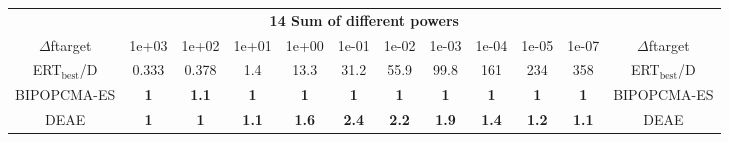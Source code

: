 \begin{tabular}{cccccccccccc}
 & \multicolumn{10}{c}{{\normalsize \textbf{14 Sum of different powers}}}\\
$\Delta$ftarget& 1e+03& 1e+02& 1e+01& 1e+00& 1e-01& 1e-02& 1e-03& 1e-04& 1e-05& 1e-07 & $\Delta$ftarget \\
ERT$_{\textrm{best}}$/D& 0.333& 0.378& 1.4& 13.3& 31.2& 55.9& 99.8& 161& 234& 358 & ERT$_{\textrm{best}}$/D \\
\hline
BIPOPCMA-ES & \textbf{1} & \textbf{1.1} & \textbf{1} & \textbf{1} & \textbf{1} & \textbf{1} & \textbf{1} & \textbf{1} & \textbf{1} & \textbf{1} & BIPOPCMA-ES \cite{add_an_entry_for_BIPOPCMA-ES_in_bbob.bib}\\
DEAE & \textbf{1} & \textbf{1} & \textbf{1.1} & \textbf{1.6} & \textbf{2.4} & \textbf{2.2} & \textbf{1.9} & \textbf{1.4} & \textbf{1.2} & \textbf{1.1} & DEAE \cite{add_an_entry_for_DEAE_in_bbob.bib}
\end{tabular}
